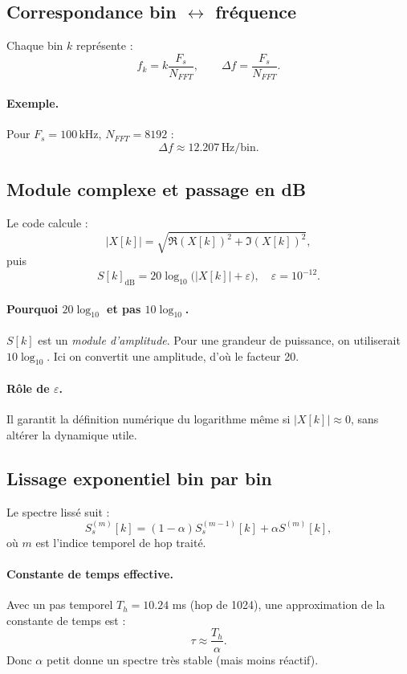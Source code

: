 \documentclass[a4paper,11pt]{article}
\begin{document}
\subsection{Correspondance bin \(\leftrightarrow\) fr\'equence}

Chaque bin \(k\) repr\'esente :
\[
f_k = k\frac{F_s}{N_{FFT}},\qquad \Delta f = \frac{F_s}{N_{FFT}}.
\]

\paragraph{Exemple.}
Pour \(F_s=100\,\text{kHz}\), \(N_{FFT}=8192\) :
\[
\Delta f \approx 12.207\,\text{Hz/bin}.
\]

\subsection{Module complexe et passage en dB}

Le code calcule :
\[
|X[k]| = \sqrt{\Re(X[k])^2+\Im(X[k])^2},
\]
puis
\[
S[k]_{\mathrm{dB}} = 20\log_{10}\!\big(|X[k]|+\varepsilon\big),\quad \varepsilon=10^{-12}.
\]

\paragraph{Pourquoi \(20\log_{10}\) et pas \(10\log_{10}\).}
\(S[k]\) est un \emph{module d'amplitude}. Pour une grandeur de puissance, on utiliserait \(10\log_{10}\). Ici on convertit une amplitude, d'o\`u le facteur 20.

\paragraph{R\^ole de \(\varepsilon\).}
Il garantit la d\'efinition num\'erique du logarithme m\^eme si \(|X[k]|\approx 0\), sans alt\'erer la dynamique utile.

\subsection{Lissage exponentiel bin par bin}

Le spectre liss\'e suit :
\[
S_s^{(m)}[k]=(1-\alpha)S_s^{(m-1)}[k]+\alpha S^{(m)}[k],
\]
o\`u \(m\) est l'indice temporel de hop trait\'e.

\paragraph{Constante de temps effective.}
Avec un pas temporel \(T_h=10.24\) ms (hop de 1024), une approximation de la constante de temps est :
\[
\tau \approx \frac{T_h}{\alpha}.
\]
Donc \(\alpha\) petit donne un spectre tr\`es stable (mais moins r\'eactif).
\end{document}
